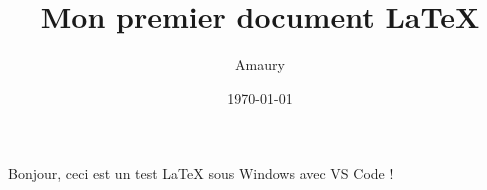 \documentclass{article}
\title{Mon premier document LaTeX}
\author{Amaury}
\date{\today}
\begin{document}
\maketitle

Bonjour, ceci est un test \LaTeX{} sous Windows avec VS Code !
\end{document}
